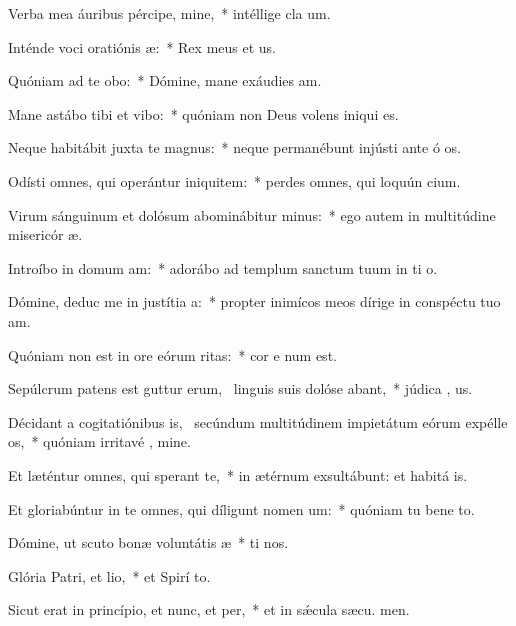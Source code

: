 \item Verba mea áuribus pércipe, mine,~* intéllige cla um.
\item Inténde voci oratiónis æ:~* Rex meus et  us.
\item Quóniam ad te obo:~* Dómine, mane exáudies  am.
\item Mane astábo tibi et vibo:~* quóniam non Deus volens iniqui  es.
\item Neque habitábit juxta te magnus:~* neque permanébunt injústi ante ó os.
\item Odísti omnes, qui operántur iniquitem:~* perdes omnes, qui loquún cium.
\item Virum sánguinum et dolósum abominábitur minus:~* ego autem in multitúdine misericór æ.
\item Introíbo in domum am:~* adorábo ad templum sanctum tuum in ti o.
\item Dómine, deduc me in justítia a:~* propter inimícos meos dírige in conspéctu tuo  am.
\item Quóniam non est in ore eórum ritas:~* cor e num est.
\item Sepúlcrum patens est guttur erum,~\pscross{} linguis suis dolóse abant,~* júdica , us.
\item Décidant a cogitatiónibus is,~\pscross{} secúndum multitúdinem impietátum eórum expélle os,~* quóniam irritavé , mine.
\item Et læténtur omnes, qui sperant  te,~* in ætérnum exsultábunt: et habitá  is.
\item Et gloriabúntur in te omnes, qui díligunt nomen um:~* quóniam tu bene to.
\item Dómine, ut scuto bonæ voluntátis æ~* ti nos.
\item Glória Patri, et lio,~* et Spirí to.
\item Sicut erat in princípio, et nunc, et per,~* et in sǽcula sæcu. men.
